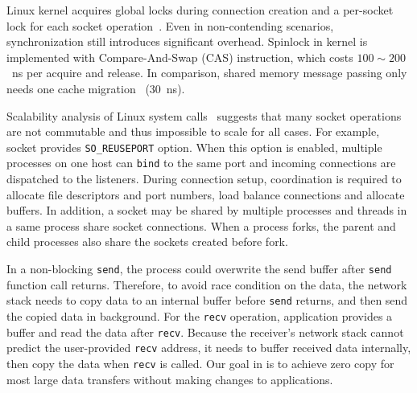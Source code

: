 Linux kernel acquires global locks during connection creation and a per-socket lock for each socket operation~\cite{boyd2010analysis,han2012megapipe,lin2016scalable}. Even in non-contending scenarios, synchronization still introduces significant overhead. Spinlock in kernel is implemented with Compare-And-Swap (CAS) instruction, which costs $100\sim200$~ns per acquire and release. In comparison, shared memory message passing only needs one cache migration~\cite{roghanchi2017ffwd} (30~ns).

Scalability analysis of Linux system calls~\cite{boyd2010analysis,clements2015scalable} suggests that many socket operations are not commutable and thus impossible to scale for all cases. For example, socket provides \texttt{SO\_REUSEPORT} option. When this option is enabled, multiple processes on one host can \texttt{bind} to the same port and incoming connections are dispatched to the listeners. During connection setup, coordination is required to allocate file descriptors and port numbers, load balance connections and allocate buffers. In addition, a socket may be shared by multiple processes and threads in a same process share socket connections. When a process forks, the parent and child processes also share the sockets created before fork.

In a non-blocking \texttt{send}, the process could overwrite the send buffer after \texttt{send} function call returns. Therefore, to avoid race condition on the data, the network stack needs to copy data to an internal buffer before \texttt{send} returns, and then send the copied data in background.
For the \texttt{recv} operation, application provides a buffer and read the data after \texttt{recv}.
Because the receiver's network stack cannot predict the user-provided \texttt{recv} address, it needs to buffer received data internally, then copy the data when \texttt{recv} is called.
Our goal in \sys is to achieve zero copy for most large data transfers without making changes to applications.

